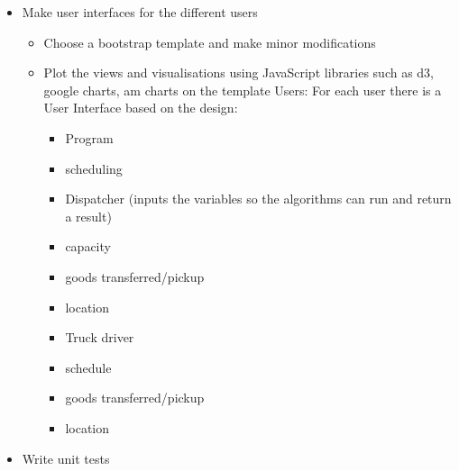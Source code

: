 \documentclass[paper=a4, fontsize=11pt]{scrartcl} %
\numberwithin{equation}{section} %
\numberwithin{figure}{section} %
\numberwithin{table}{section} %
\begin{document}
\begin{itemize}
	\item  Make user interfaces for the different users

		\begin{itemize}
		 \item Choose a bootstrap template and make minor modifications
		\item Plot the views and visualisations using JavaScript libraries such as d3, google charts, am charts on the template Users: For each user there is a User Interface based on the design:
		
		\begin{itemize}
		\item Program
		\item scheduling
		\item Dispatcher (inputs the variables so the algorithms can run and return a result)
		\item capacity
					\item goods transferred/pickup
					\item location
				\item Truck driver
					\item schedule
					\item goods transferred/pickup
					\item location
		\end{itemize}
		
		\end{itemize}
	\item Write unit tests 
\end{itemize}
\end{document}
